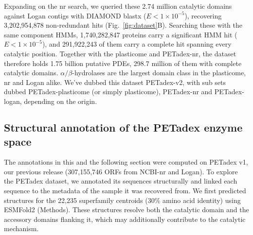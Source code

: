 \documentclass[pdflatex,sn-nature,iicol]{sn-jnl}%
\begin{document}
Expanding on the nr search, we queried these 2.74 million catalytic domains against Logan contigs with DIAMOND blastx ($E < 1\times10^{-5}$), recovering 3,202,954,878 non-redundant hits (Fig.~\ref{fig:dataset}B). Searching these with the same component HMMs, 1,740,282,847 proteins carry a significant HMM hit ($E < 1\times10^{-5}$), and 291,922,243 of them carry a complete hit spanning every catalytic position. Together with the plasticome and PETadex-nr, the dataset therefore holds 1.75 billion putative PDEs, 298.7 million of them with complete catalytic domains. $\alpha/\beta$-hydrolases are the largest domain class in the plasticome, nr and Logan alike. We've dubbed this dataset PETadex-v2, with sub sets dubbed PETadex-plasticome (or simply plasticome), PETadex-nr and PETadex-logan, depending on the origin. %

\subsection{Structural annotation of the PETadex enzyme space}

The annotations in this and the following section were computed on PETadex v1, our previous release (307,155,746 ORFs from NCBI-nr and Logan). To explore the PETadex dataset, we annotated its sequences structurally and linked each sequence to the metadata of the sample it was recovered from. We first predicted structures for the 22,235 superfamily centroids (30\% amino acid identity) using ESMFold2 (Methods). These structures resolve both the catalytic domain and the accessory domains flanking it, which may additionally contribute to the catalytic mechanism.
\end{document}
